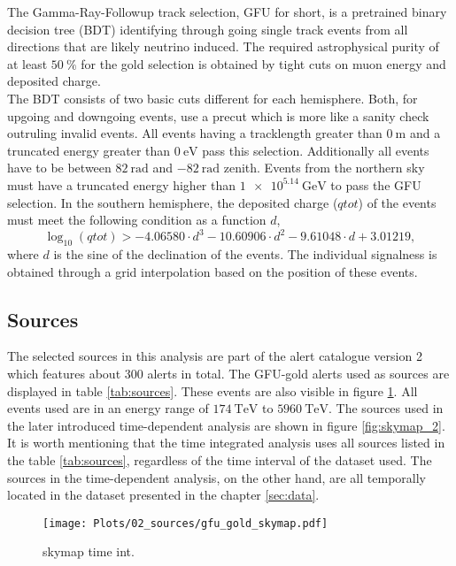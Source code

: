 The Gamma-Ray-Followup track selection, GFU for short, is a pretrained binary decision tree (BDT) identifying through going single track events from all directions that are likely neutrino induced.
The required astrophysical purity of at least $\SI{50}{\percent}$ for the gold selection is obtained by tight cuts on muon energy and deposited charge.\\
The BDT consists of two basic cuts different for each hemisphere.
Both, for upgoing and downgoing events, use a precut which is more like a sanity check outruling invalid events.
All events having a tracklength greater than $\SI{0}{\meter}$ and a truncated energy greater than $\SI{0}{\electronvolt}$ pass this selection.
Additionally all events have to be between $\SI{82}{\radian}$ and $\SI{-82}{\radian}$ zenith.
Events from the northern sky must have a truncated energy higher than $\SI{1e5.14}{\giga\electronvolt}$ to pass the GFU selection.
In the southern hemisphere, the deposited charge ($qtot$) of the events must meet the following condition as a function $d$,
\begin{equation}
  \log_{10}(qtot) > -4.06580\cdot d^3 - 10.60906\cdot d^2  -9.61048\cdot d + 3.01219,
\end{equation}
where $d$ is the sine of the declination of the events.
The individual signalness is obtained through a grid interpolation based on the position of these events.

\subsection{Sources}

The selected sources in this analysis are part of the alert catalogue version 2 which features about 300 alerts in total.
The GFU-gold alerts used as sources are displayed in table \ref{tab:sources}.
These events are also visible in figure \ref{fig:skymap_1}.
All events used are in an energy range of $\SI{174}{\tera\electronvolt}$ to $\SI{5960}{\tera\electronvolt}$.
The sources used in the later introduced time-dependent analysis are shown in figure \ref{fig:skymap_2}.
It is worth mentioning that the time integrated analysis uses all sources listed in the table \ref{tab:sources}, regardless of the time interval of the dataset used.
The sources in the time-dependent analysis, on the other hand, are all temporally located in the dataset presented in the chapter \ref{sec:data}.

\begin{figure}
    \centering
    \texttt{[image: Plots/02\_sources/gfu\_gold\_skymap.pdf]}
    \label{fig:skymap_1}
    \caption{skymap time int.}
\end{figure}

